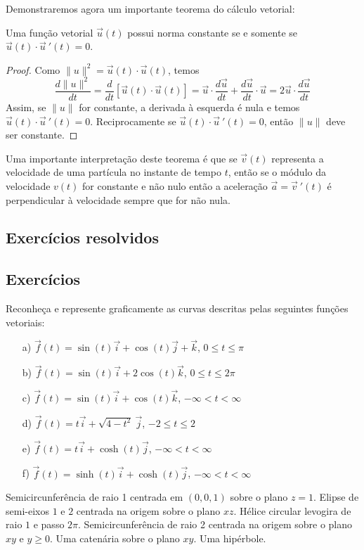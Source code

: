 Demonstraremos agora um importante teorema do cálculo vetorial:
\begin{teo}\label{teodernormacst} Uma função vetorial $\vec{u}(t)$ possui norma constante se e somente se $\vec{u}(t)\cdot\vec{u}\!~'(t)=0$. 
\end{teo}
\begin{proof} Como $\|u\|^2=\vec{u}(t)\cdot\vec{u}(t)$, temos
$$\frac{d \|u\|^2}{dt}=\frac{d}{dt}\left[\vec{u}(t)\cdot\vec{u}(t)\right]=\vec{u}\cdot\frac{d\vec{u}}{dt}+\frac{d\vec{u}}{dt}\cdot\vec{u}=2\vec{u}\cdot\frac{d\vec{u}}{dt}$$
Assim, se $\|u\|$ for constante, a derivada à esquerda é nula e temos $\vec{u}(t)\cdot\vec{u}\!~'(t)=0$. Reciprocamente se $\vec{u}(t)\cdot\vec{u}\!~'(t)=0$, então $\|u\|$ deve ser constante.
\end{proof}
\begin{obs} Uma importante interpretação deste teorema é que se $\vec{v}(t)$ representa a velocidade de uma partícula no instante de tempo $t$, então se o módulo da velocidade $v(t)$ for constante e não nulo então a aceleração $\vec{a}=\vec{v}\!~'(t)$ é perpendicular à velocidade sempre que for não nula.  
\end{obs}


\subsection*{Exercícios resolvidos}

\construirExeresol


\subsection*{Exercícios}

\begin{exer} Reconheça e represente graficamente as curvas descritas pelas seguintes funções vetoriais:
\begin{itemize}
\item [a)] $\vec{f}(t)=\sin(t)\vec{i}+\cos(t)\vec{j}+\vec{k}$, $0\leq t \leq \pi$
\item [b)] $\vec{f}(t)=\sin(t)\vec{i}+2\cos(t)\vec{k}$, $0\leq t \leq 2\pi$
\item [c)] $\vec{f}(t)=\sin(t)\vec{i}+\cos(t)\vec{k}$, $-\infty < t < \infty$
\item [d)] $\vec{f}(t)=t\vec{i}+\sqrt{4-t^2}~\!\vec{j}$, $-2 \leq t \leq 2$
\item [e)] $\vec{f}(t)=t\vec{i}+\cosh(t)\vec{j}$, $-\infty < t < \infty $
\item [f)] $\vec{f}(t)=\sinh(t)\vec{i}+\cosh(t)\vec{j}$, $-\infty < t< \infty $
\end{itemize} 
\end{exer}
\begin{resp} Semicircunferência de raio 1 centrada em $(0,0,1)$ sobre o plano $z=1$. Elipse de semi-eixos $1$ e $2$ centrada na origem sobre o plano $xz$. Hélice circular levogira de raio $1$ e passo $2\pi$.  Semicircunferência de raio 2 centrada na origem sobre o plano $xy$ e $y\geq 0$. Uma catenária sobre o plano $xy$. Uma hipérbole. 
\end{resp}

